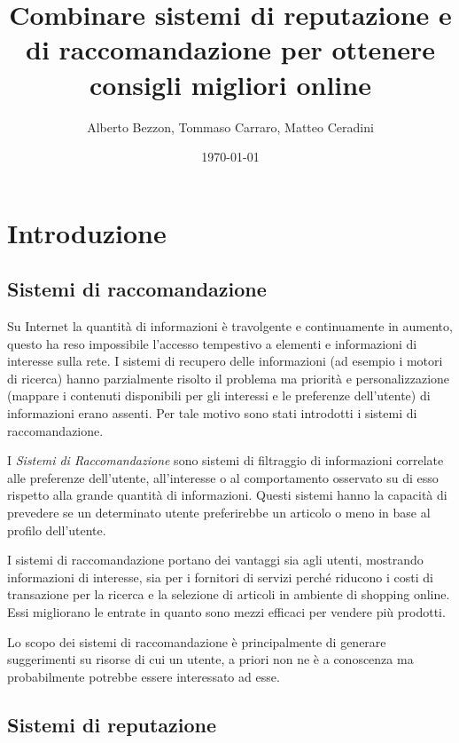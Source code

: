 \documentclass{report}
\author{Alberto Bezzon, Tommaso Carraro, Matteo Ceradini} \title{Combinare sistemi di reputazione e di raccomandazione per ottenere consigli migliori online} \date{\today}
\begin{document}
	\maketitle
	\tableofcontents
	\listoffigures
	\listoftables
	\newpage
	\renewcommand*{\arraystretch}{2}
	\hypertarget{header-n0}{%
		\section{Introduzione}\label{header-n0}}
	
	\hypertarget{header-n2}{%
		\subsection{Sistemi di raccomandazione}\label{header-n2}}
	
	Su Internet la quantità di informazioni è travolgente e continuamente in
	aumento, questo ha reso impossibile l'accesso tempestivo a elementi e
	informazioni di interesse sulla rete. I sistemi di recupero delle
	informazioni (ad esempio i motori di ricerca) hanno parzialmente risolto
	il problema ma priorità e personalizzazione (mappare i contenuti
	disponibili per gli interessi e le preferenze dell'utente) di
	informazioni erano assenti. Per tale motivo sono stati introdotti i sistemi di raccomandazione.
	
	I \emph{Sistemi di Raccomandazione} sono sistemi di filtraggio di
	informazioni correlate alle preferenze dell'utente, all'interesse o al
	comportamento osservato su di esso rispetto alla grande quantità di
	informazioni. Questi sistemi hanno la capacità di prevedere se un
	determinato utente preferirebbe un articolo o meno in base al profilo
	dell'utente.
	
	I sistemi di raccomandazione portano dei vantaggi sia agli utenti,
	mostrando informazioni di interesse, sia per i fornitori di servizi
	perché riducono i costi di transazione per la ricerca e la selezione di
	articoli in ambiente di shopping online. Essi migliorano le entrate in
	quanto sono mezzi efficaci per vendere più prodotti.
	
	Lo scopo dei sistemi di raccomandazione è principalmente di generare
	suggerimenti su risorse di cui un utente, a priori non ne è a conoscenza
	ma probabilmente potrebbe essere interessato ad esse.
	
	\hypertarget{header-n15}{%
		\subsection{Sistemi di reputazione}\label{header-n15}}
	
\end{document}
